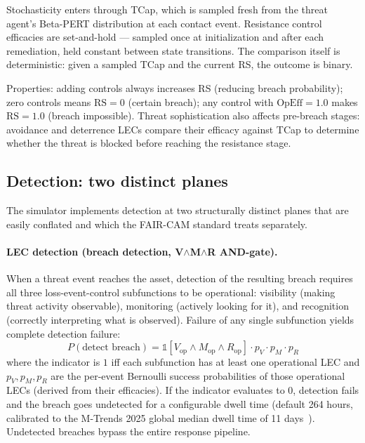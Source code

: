 \documentclass[11pt,a4paper]{article}
\begin{document}
Stochasticity enters through TCap, which is sampled fresh from the threat agent's Beta-PERT distribution at each contact event. Resistance control efficacies are set-and-hold --- sampled once at initialization and after each remediation, held constant between state transitions. The comparison itself is deterministic: given a sampled TCap and the current RS, the outcome is binary.

Properties: adding controls always increases RS (reducing breach probability); zero controls means $\mathrm{RS} = 0$ (certain breach); any control with $\mathrm{OpEff} = 1.0$ makes $\mathrm{RS} = 1.0$ (breach impossible). Threat sophistication also affects pre-breach stages: avoidance and deterrence LECs compare their efficacy against TCap to determine whether the threat is blocked before reaching the resistance stage.

\subsection{Detection: two distinct planes}
\label{sec:detect}

The simulator implements detection at two structurally distinct planes that are easily conflated and which the FAIR-CAM standard treats separately.

\paragraph{LEC detection (breach detection, V$\wedge$M$\wedge$R AND-gate).} When a threat event reaches the asset, detection of the resulting breach requires all three loss-event-control subfunctions to be operational: visibility (making threat activity observable), monitoring (actively looking for it), and recognition (correctly interpreting what is observed). Failure of any single subfunction yields complete detection failure:
\begin{equation}
    P(\text{detect breach}) = \mathbb{1}[V_{\text{op}} \wedge M_{\text{op}} \wedge R_{\text{op}}] \cdot p_{V} \cdot p_{M} \cdot p_{R}
    \label{eq:detect-and}
\end{equation}
where the indicator is $1$ iff each subfunction has at least one operational LEC and $p_{V}, p_{M}, p_{R}$ are the per-event Bernoulli success probabilities of those operational LECs (derived from their efficacies). If the indicator evaluates to $0$, detection fails and the breach goes undetected for a configurable dwell time (default 264 hours, calibrated to the M-Trends 2025 global median dwell time of 11 days~\citep{MTrends2025}). Undetected breaches bypass the entire response pipeline.
\end{document}

